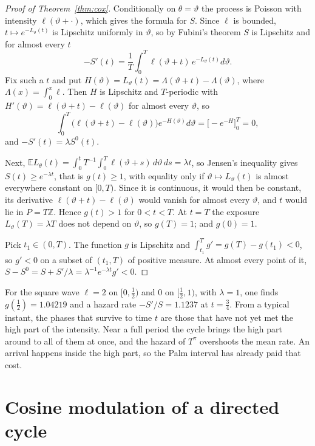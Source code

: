 \documentclass[11pt]{amsart}
\theoremstyle{remark}
\newcommand{\E}{\mathbb E}
\begin{document}
\begin{proof}[Proof of Theorem~\ref{thm:cox}]
Conditionally on $\theta=\vartheta$ the process is Poisson with intensity $\ell(\vartheta+\cdot)$, which gives the formula for $S$. Since $\ell$ is bounded, $t\mapsto e^{-L_\vartheta(t)}$ is Lipschitz uniformly in $\vartheta$, so by Fubini's theorem $S$ is Lipschitz and for almost every $t$
\[
-S'(t)=\frac1T\int_0^T\ell(\vartheta+t)\,e^{-L_\vartheta(t)}d\vartheta .
\]
Fix such a $t$ and put $H(\vartheta)=L_\vartheta(t)=\Lambda(\vartheta+t)-\Lambda(\vartheta)$, where $\Lambda(x)=\int_0^x\ell$. Then $H$ is Lipschitz and $T$-periodic with $H'(\vartheta)=\ell(\vartheta+t)-\ell(\vartheta)$ for almost every $\vartheta$, so
\[
\int_0^T\bigl(\ell(\vartheta+t)-\ell(\vartheta)\bigr)e^{-H(\vartheta)}d\vartheta=\bigl[-e^{-H}\bigr]_0^T=0,
\]
and $-S'(t)=\lambda S^0(t)$.

Next, $\E L_\theta(t)=\int_0^t T^{-1}\int_0^T\ell(\vartheta+s)\,d\vartheta\,ds=\lambda t$, so Jensen's inequality gives $S(t)\ge e^{-\lambda t}$, that is $g(t)\ge1$, with equality only if $\vartheta\mapsto L_\vartheta(t)$ is almost everywhere constant on $[0,T)$. Since it is continuous, it would then be constant, its derivative $\ell(\vartheta+t)-\ell(\vartheta)$ would vanish for almost every $\vartheta$, and $t$ would lie in $P=T\mathbb Z$. Hence $g(t)>1$ for $0<t<T$. At $t=T$ the exposure $L_\vartheta(T)=\lambda T$ does not depend on $\vartheta$, so $g(T)=1$; and $g(0)=1$.

Pick $t_1\in(0,T)$. The function $g$ is Lipschitz and $\int_{t_1}^Tg'=g(T)-g(t_1)<0$, so $g'<0$ on a subset of $(t_1,T)$ of positive measure. At almost every point of it, $S-S^0=S+S'/\lambda=\lambda^{-1}e^{-\lambda t}g'<0$.
\end{proof}

For the square wave $\ell=2$ on $[0,\frac12)$ and $0$ on $[\frac12,1)$, with $\lambda=1$, one finds $g(\frac12)=1.04219$ and a hazard rate $-S'/S=1.1237$ at $t=\frac34$. From a typical instant, the phases that survive to time $t$ are those that have not yet met the high part of the intensity. Near a full period the cycle brings the high part around to all of them at once, and the hazard of $T^\pi$ overshoots the mean rate. An arrival happens inside the high part, so the Palm interval has already paid that cost.

\section{Cosine modulation of a directed cycle}
\end{document}
